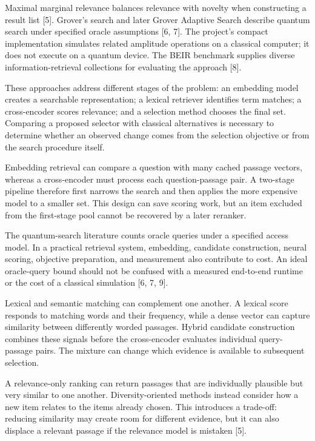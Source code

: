 \documentclass[11pt,a4paper]{article}
\begin{document}
Maximal marginal relevance balances relevance with novelty when constructing a result list [5]. Grover's search and later Grover Adaptive Search describe quantum search under specified oracle assumptions [6, 7]. The project's compact implementation simulates related amplitude operations on a classical computer; it does not execute on a quantum device. The BEIR benchmark supplies diverse information-retrieval collections for evaluating the approach [8].

These approaches address different stages of the problem: an embedding model creates a searchable representation; a lexical retriever identifies term matches; a cross-encoder scores relevance; and a selection method chooses the final set. Comparing a proposed selector with classical alternatives is necessary to determine whether an observed change comes from the selection objective or from the search procedure itself.

Embedding retrieval can compare a question with many cached passage vectors, whereas a cross-encoder must process each question-passage pair. A two-stage pipeline therefore first narrows the search and then applies the more expensive model to a smaller set. This design can save scoring work, but an item excluded from the first-stage pool cannot be recovered by a later reranker.

The quantum-search literature counts oracle queries under a specified access model. In a practical retrieval system, embedding, candidate construction, neural scoring, objective preparation, and measurement also contribute to cost. An ideal oracle-query bound should not be confused with a measured end-to-end runtime or the cost of a classical simulation [6, 7, 9].

Lexical and semantic matching can complement one another. A lexical score responds to matching words and their frequency, while a dense vector can capture similarity between differently worded passages. Hybrid candidate construction combines these signals before the cross-encoder evaluates individual query-passage pairs. The mixture can change which evidence is available to subsequent selection.

A relevance-only ranking can return passages that are individually plausible but very similar to one another. Diversity-oriented methods instead consider how a new item relates to the items already chosen. This introduces a trade-off: reducing similarity may create room for different evidence, but it can also displace a relevant passage if the relevance model is mistaken [5].
\end{document}
